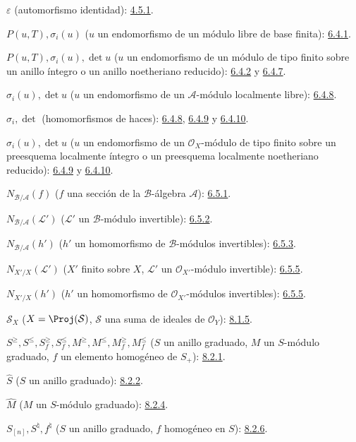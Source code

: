 \documentclass[oneside,10pt]{amsart}
\renewcommand{\leq}{\leqslant}
\renewcommand{\geq}{\geqslant}
\begin{document}
$\varepsilon$ (automorfismo identidad): \hyperref[II.4.5.1-fr]{4.5.1}.

$P(u,T),\sigma_i(u)$ ($u$ un endomorfismo de un módulo libre de base finita): \hyperref[II.6.4.1-fr]{6.4.1}.

$P(u,T),\sigma_i(u),\det u$
($u$ un endomorfismo de un módulo de tipo finito sobre un anillo íntegro o un
anillo noetheriano reducido): \hyperref[II.6.4.2-fr]{6.4.2} y \hyperref[II.6.4.7-fr]{6.4.7}.

$\sigma_i(u),\det u$ ($u$ un endomorfismo de un $\mathcal{A}$-módulo localmente libre): \hyperref[II.6.4.8-fr]{6.4.8}.

$\sigma_i,\det$ (homomorfismos de haces): \hyperref[II.6.4.8-fr]{6.4.8}, \hyperref[II.6.4.9-fr]{6.4.9} y \hyperref[II.6.4.10-fr]{6.4.10}.

$\sigma_i(u),\det u$
($u$ un endomorfismo de un $\mathcal{O}_X$-módulo de tipo finito sobre un preesquema
localmente íntegro o un preesquema localmente noetheriano reducido):
\hyperref[II.6.4.9-fr]{6.4.9} y \hyperref[II.6.4.10-fr]{6.4.10}.

$N_{\mathcal{B}/\mathcal{A}}(f)$
($f$ una sección de la $\mathcal{B}$-álgebra $\mathcal{A}$): \hyperref[II.6.5.1-fr]{6.5.1}.

$N_{\mathcal{B}/\mathcal{A}}(\mathcal{L}')$
($\mathcal{L}'$ un $\mathcal{B}$-módulo invertible): \hyperref[II.6.5.2-fr]{6.5.2}.

$N_{\mathcal{B}/\mathcal{A}}(h')$
($h'$ un homomorfismo de $\mathcal{B}$-módulos invertibles): \hyperref[II.6.5.3-fr]{6.5.3}.

$N_{X'/X}(\mathcal{L}')$
($X'$ finito sobre $X$, $\mathcal{L}'$ un $\mathcal{O}_{X'}$-módulo invertible): \hyperref[II.6.5.5-fr]{6.5.5}.

$N_{X'/X}(h')$
($h'$ un homomorfismo de $\mathcal{O}_{X'}$-módulos invertibles): \hyperref[II.6.5.5-fr]{6.5.5}.

$\mathcal{S}_X$ ($X=\Proj(\mathcal{S})$, $\mathcal{S}$ una suma de ideales de
$\mathcal{O}_Y$): \hyperref[II.8.1.5-fr]{8.1.5}.

$S^\geq,S^\leq,S_f^\geq,S_f^\leq,
M^\geq,M^\leq,M_f^\geq,M_f^\leq$
($S$ un anillo graduado, $M$ un $S$-módulo graduado,
$f$ un elemento homogéneo de $S_+$): \hyperref[II.8.2.1-fr]{8.2.1}.

$\widehat S$ ($S$ un anillo graduado): \hyperref[II.8.2.2-fr]{8.2.2}.

$\widehat M$ ($M$ un $S$-módulo graduado): \hyperref[II.8.2.4-fr]{8.2.4}.

$S_{[n]},S^\natural,f^\natural$
($S$ un anillo graduado, $f$ homogéneo en $S$): \hyperref[II.8.2.6-fr]{8.2.6}.
\end{document}
